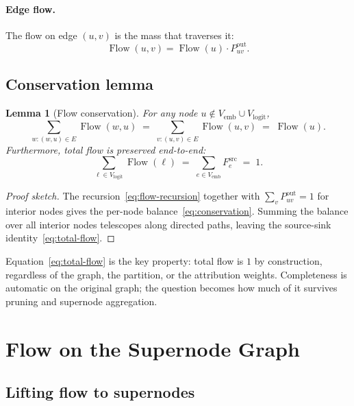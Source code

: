 \documentclass[11pt]{article}
\DeclareMathOperator{\Flow}{Flow}
\newtheorem{lemma}{Lemma}
\begin{document}
\paragraph{Edge flow.}
The flow on edge $(u, v)$ is the mass that traverses it:
\begin{equation}
\Flow(u, v) = \Flow(u) \cdot P^{\text{out}}_{uv}.
\label{eq:edge-flow}
\end{equation}

\subsection{Conservation lemma}

\begin{lemma}[Flow conservation]\label{lem:conservation}
For any node $u \notin V_{\text{emb}} \cup V_{\text{logit}}$,
\begin{equation}
\sum_{w : (w, u) \in E} \Flow(w, u)
\;=\;
\sum_{v : (u, v) \in E} \Flow(u, v)
\;=\;
\Flow(u).
\label{eq:conservation}
\end{equation}
Furthermore, total flow is preserved end-to-end:
\begin{equation}
\sum_{\ell \in V_{\text{logit}}} \Flow(\ell)
\;=\;
\sum_{e \in V_{\text{emb}}} F^{\text{src}}_e
\;=\;
1.
\label{eq:total-flow}
\end{equation}
\end{lemma}

\begin{proof}[Proof sketch]
The recursion~\eqref{eq:flow-recursion} together with
$\sum_v P^{\text{out}}_{uv} = 1$ for interior nodes gives the per-node
balance~\eqref{eq:conservation}. Summing the balance over all
interior nodes telescopes along directed paths, leaving the
source-sink identity~\eqref{eq:total-flow}.
\end{proof}

Equation~\eqref{eq:total-flow} is the key property: total flow is
$1$ by construction, regardless of the graph, the partition, or
the attribution weights. Completeness is automatic on the original
graph; the question becomes how much of it survives pruning and
supernode aggregation.

\section{Flow on the Supernode Graph}\label{sec:supernode-flow}

\subsection{Lifting flow to supernodes}
\end{document}
